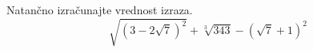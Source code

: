 \documentclass[addpoints,12pt]{exam}
\begin{document}
\begin{questions}

    
    















\newpage
    \question[5]
    Natančno izračunajte vrednost izraza.
    $$ \sqrt{\left(3-2\sqrt{7}\right)^2}+\sqrt[3]{343}-\left(\sqrt{7}+1\right)^2 $$


\end{questions}
\end{document}
